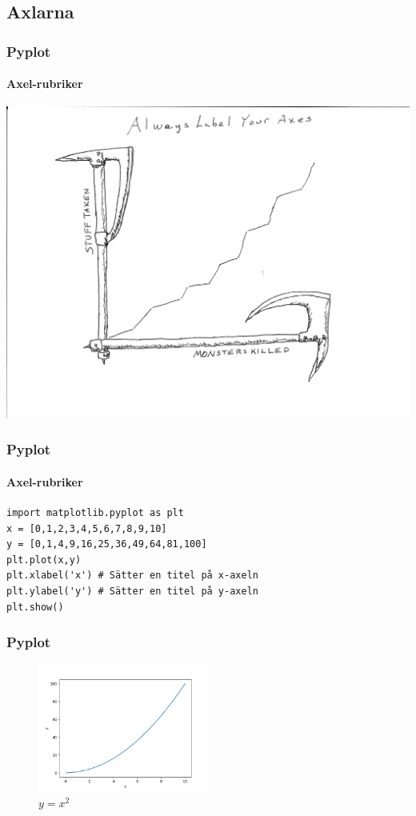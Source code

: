 \documentclass[aspectratio=169]{beamer}
\begin{document}
\subsection{Axlarna}

\begin{frame}[fragile]
\frametitle{Pyplot}
\framesubtitle{Axel-rubriker}

\centering
\includegraphics[width=.5\textwidth]{labelyouraxes.jpg}

\end{frame}

\begin{frame}[fragile]
\frametitle{Pyplot}
\framesubtitle{Axel-rubriker}

\begin{lstlisting}
import matplotlib.pyplot as plt
x = [0,1,2,3,4,5,6,7,8,9,10]
y = [0,1,4,9,16,25,36,49,64,81,100]
plt.plot(x,y)
plt.xlabel('x') # Sätter en titel på x-axeln
plt.ylabel('y') # Sätter en titel på y-axeln
plt.show()
\end{lstlisting}

\end{frame}

\begin{frame}
\frametitle{Pyplot}

\begin{figure}
\includegraphics[width = 0.5\textwidth]{squares2.png}
\caption{$y=x^2$}
\end{figure}

\end{frame}
\end{document}

